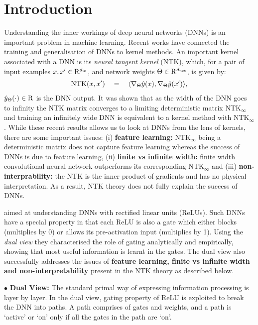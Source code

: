 \section{Introduction}
Understanding the inner workings of deep neural networks (DNNs) is an important problem in machine learning. Recent works have connected the training and generalisation of DNNs to kernel methods. An important kernel associated with a DNN is its \emph{neural tangent kernel} (NTK), which, for a pair of input examples $x,x'\in\mathrm{R}^{d_{\text{in}}}$, and network weights $\Theta\in\mathrm{R}^{d_{\text{net}}}$, is given by:
\begin{align*}
 \text{NTK}(x,x')\quad = \quad \langle \nabla_{\Theta}\hat{y}(x), \nabla_{\Theta}\hat{y}(x')\rangle, 
\end{align*}
$\hat{y}_\Theta(\cdot)\in\mathrm{R}$ is the DNN output. It was shown that as the width of the DNN goes to infinity the NTK matrix converges to a limiting deterministic matrix $\text{NTK}_{\infty}$ and training an infinitely wide DNN is equivalent to a kernel method with $\text{NTK}_{\infty}$. While these recent results allows us to look at DNNs from the lens of kernels, there are some important issues: (i) \textbf{feature learning:} $\text{NTK}_{\infty}$ being a deterministic matrix does not capture feature learning whereas the success of DNNs is due to feature learning, (ii) \textbf{finite vs infinite width:} finite width convolutional neural network outperforms its corresponding $\text{NTK}_{\infty}$ and (iii)  \textbf{non-interprability:} the NTK is the inner product of gradients and has no physical interpretation. As a result, NTK theory does not fully explain the success of DNNs.

 \cite{npk} aimed at understanding DNNs with rectified linear units (ReLUs). Such DNNs have a special property in that each ReLU is also a gate which either blocks (multiplies by 0) or allows its pre-activation input (multiplies by 1). 
 Using the \emph{dual view} they characterised the role of gating analytically and empirically, showing that most useful information is learnt in the gates. The dual view also successfully addresses the issues of \textbf{feature learning, finite vs infinite width and non-interpretability} present in the NTK theory as described below.

$\bullet$ \textbf{Dual View:}  The standard primal way of expressing information processing is layer by layer.  In the dual view, gating property of ReLU is exploited to break the DNN into paths. A path comprises of gates and weights, and a path is `active' or `on' only if all the gates in the path are `on'. %

